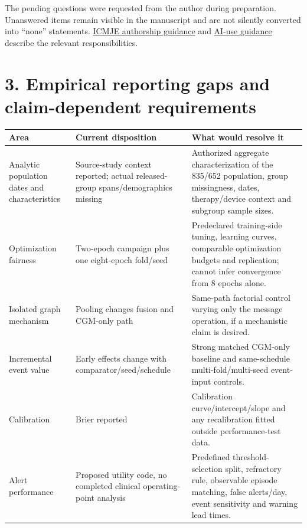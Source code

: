 \documentclass[11pt,a4paper]{article}
\begin{document}
The pending questions were requested from the author during preparation. Unanswered items remain visible in the manuscript and are not silently converted into “none” statements. \href{https://www.icmje.org/recommendations/browse/roles-and-responsibilities/defining-the-role-of-authors-and-contributors.html}{ICMJE authorship guidance} and \href{https://www.icmje.org/recommendations/browse/artificial-intelligence/ai-use-by-authors.html}{AI-use guidance} describe the relevant responsibilities.

\section*{3. Empirical reporting gaps and claim-dependent requirements}
{\small
\setlength{\tabcolsep}{3pt}
\begin{longtable}{>{\raggedright\arraybackslash}p{}>{\raggedright\arraybackslash}p{}>{\raggedright\arraybackslash}p{}}
\toprule
\textbf{Area} & \textbf{Current disposition} & \textbf{What would resolve it} \\ \midrule
\endhead
Analytic population dates and characteristics & Source-study context reported; actual released-group spans/demographics missing & Authorized aggregate characterization of the 835/652 population, group missingness, dates, therapy/device context and subgroup sample sizes. \\
Optimization fairness & Two-epoch campaign plus one eight-epoch fold/seed & Predeclared training-side tuning, learning curves, comparable optimization budgets and replication; cannot infer convergence from 8 epochs alone. \\
Isolated graph mechanism & Pooling changes fusion and CGM-only path & Same-path factorial control varying only the message operation, if a mechanistic claim is desired. \\
Incremental event value & Early effects change with comparator/seed/schedule & Strong matched CGM-only baseline and same-schedule multi-fold/multi-seed event-input controls. \\
Calibration & Brier reported & Calibration curve/intercept/slope and any recalibration fitted outside performance-test data. \\
Alert performance & Proposed utility code, no completed clinical operating-point analysis & Predefined threshold-selection split, refractory rule, observable episode matching, false alerts/day, event sensitivity and warning lead times. \\

\end{longtable}}
\end{document}
